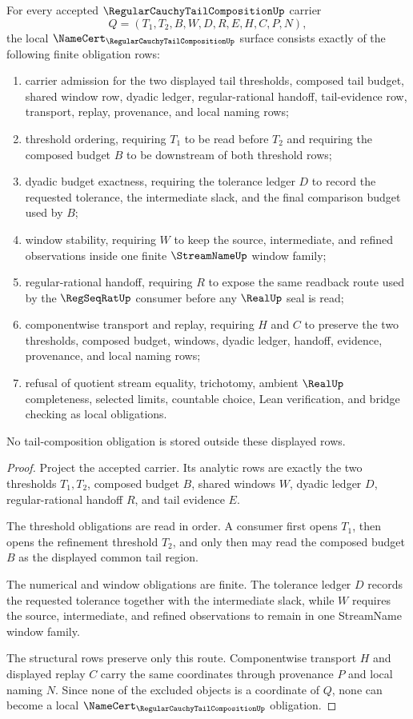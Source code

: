 \begin{theorem}
\label{thm:regular-cauchy-tail-composition-namecert-obligations}
For every accepted $\RegularCauchyTailCompositionUp$ carrier
$$
Q=(T_1,T_2,B,W,D,R,E,H,C,P,N),
$$
the local $\NameCert_{\RegularCauchyTailCompositionUp}$ surface consists exactly of the following finite obligation rows:
\begin{enumerate}
\item carrier admission for the two displayed tail thresholds, composed tail budget, shared window row, dyadic ledger, regular-rational handoff, tail-evidence row, transport, replay, provenance, and local naming rows;
\item threshold ordering, requiring $T_1$ to be read before $T_2$ and requiring the composed budget $B$ to be downstream of both threshold rows;
\item dyadic budget exactness, requiring the tolerance ledger $D$ to record the requested tolerance, the intermediate slack, and the final comparison budget used by $B$;
\item window stability, requiring $W$ to keep the source, intermediate, and refined observations inside one finite $\StreamNameUp$ window family;
\item regular-rational handoff, requiring $R$ to expose the same readback route used by the $\RegSeqRatUp$ consumer before any $\RealUp$ seal is read;
\item componentwise transport and replay, requiring $H$ and $C$ to preserve the two thresholds, composed budget, windows, dyadic ledger, handoff, evidence, provenance, and local naming rows;
\item refusal of quotient stream equality, trichotomy, ambient $\RealUp$ completeness, selected limits, countable choice, Lean verification, and bridge checking as local obligations.
\end{enumerate}
No tail-composition obligation is stored outside these displayed rows.
\end{theorem}
\begin{proof}
Project the accepted carrier. Its analytic rows are exactly the two thresholds $T_1,T_2$, composed budget $B$, shared windows $W$, dyadic ledger $D$, regular-rational handoff $R$, and tail evidence $E$.

The threshold obligations are read in order. A consumer first opens $T_1$, then opens the refinement threshold $T_2$, and only then may read the composed budget $B$ as the displayed common tail region.

The numerical and window obligations are finite. The tolerance ledger $D$ records the requested tolerance together with the intermediate slack, while $W$ requires the source, intermediate, and refined observations to remain in one StreamName window family.

The structural rows preserve only this route. Componentwise transport $H$ and displayed replay $C$ carry the same coordinates through provenance $P$ and local naming $N$. Since none of the excluded objects is a coordinate of $Q$, none can become a local $\NameCert_{\RegularCauchyTailCompositionUp}$ obligation.
\end{proof}

